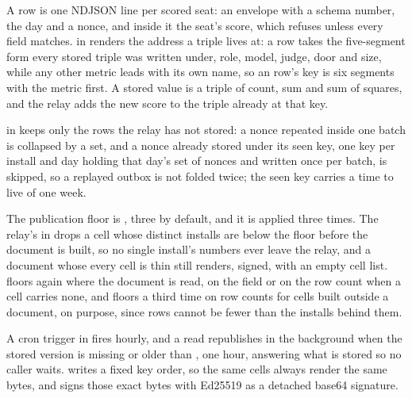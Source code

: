 A row is one NDJSON line per scored seat: an envelope with a schema number, the
day and a nonce, and inside it the seat's score, which 
refuses unless every field matches.  in  renders the address a triple
lives at: a  row takes the five-segment form every stored
triple was written under, role, model, judge, door and size, while any other
metric leads with its own name, so an  row's key is six segments
with the metric first. A stored value is
a triple of count, sum and sum of squares, and the relay adds the new score to
the triple already at that key.

 in  keeps only the rows the relay has
not stored: a nonce repeated inside one batch is collapsed by a set, and a nonce
already stored under its seen key, one key per install and day holding that
day's set of nonces and written once per batch, is skipped, so a replayed outbox
is not folded twice; the seen key carries a time to live of one week.

The publication floor is , three by default, and it is
applied three times. The relay's  in 
drops a cell whose distinct installs are below the floor before the document is
built, so no single install's numbers ever leave the relay, and a document whose
every cell is thin still renders, signed, with an empty cell list.
 floors again where the document is read,
on the  field or on the row count when a cell carries none, and
 floors a third time on row counts for cells built
outside a document, on purpose, since rows cannot be fewer than the installs
behind them.

A cron trigger in  fires hourly, and a read republishes in
the background when the stored version is missing or older than
, one hour, answering what is stored so no caller waits.
 writes a fixed key order, so the same cells always render the
same bytes, and  signs those exact bytes with Ed25519 as a
detached base64 signature.

